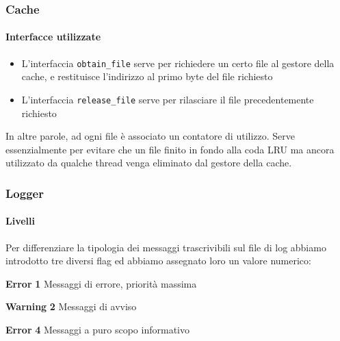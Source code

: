 \documentclass{beamer}
\begin{document}
\begin{frame}[fragile]
\frametitle{Cache}
\framesubtitle{Interfacce utilizzate}

\begin{itemize}


\item L'interfaccia \texttt{obtain\_file} serve per richiedere un certo file al gestore della cache, e
restituisce l'indirizzo al primo byte del file richiesto

\item L'interfaccia \texttt{release\_file} serve per rilasciare il file precedentemente richiesto
\end{itemize}

In altre parole, ad ogni file è associato un contatore di utilizzo. Serve essenzialmente per evitare che un file finito in fondo alla coda LRU ma ancora utilizzato da qualche thread venga eliminato dal gestore della cache.


\end{frame}

\begin{frame}
\frametitle{Logger}
\framesubtitle{Livelli}

Per differenziare la tipologia dei messaggi trascrivibili sul file di log abbiamo
introdotto tre diversi flag ed abbiamo assegnato loro un valore numerico:

\medskip
\medskip

\textbf{Error} \hspace{1.2cm} \textbf{1} \hspace{1cm} Messaggi di errore, priorità massima

\medskip

\textbf{Warning} \hspace{0.64cm} \textbf{2} \hspace{1cm} Messaggi di avviso

\medskip

\textbf{Error} \hspace{1.2cm} \textbf{4} \hspace{1cm} Messaggi a puro scopo informativo

\medskip
\medskip
\medskip


\end{frame}
\end{document}

